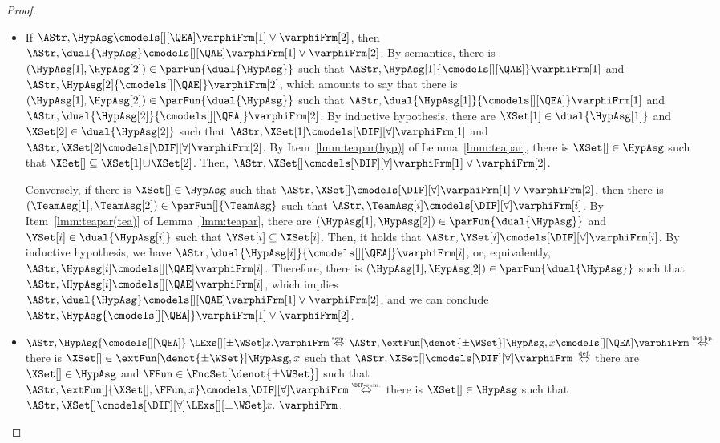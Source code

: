 \documentclass[authoryear]{elsarticle}
\newcommand{\iffExpl}[1]{\mathrel{\stackrel{\text{\tiny #1}}{\Leftrightarrow}}}
\newcommand{\Team}[1][]{{\XSet[#1]}}
\newcommand{\IFmodels}{\cmodels[\DIF][\forall]}
\newcommand{\EAmodels}{{\cmodels[][\QEA]}}
\newcommand{\AEmodels}{{\cmodels[][\QAE]}}
\begin{document}
\begin{proof}
\begin{itemize}
\begin{itemize}
    \item[{($\varphiFrm[][_\exists]=\varphiFrm[1] \lor \varphiFrm[2]$)}]
      If $\AStr, \HypAsg \cmodels[][\QEA] \varphiFrm[1] \lor \varphiFrm[2]$,
      then $\AStr, \dual{\HypAsg} \cmodels[][\QAE] \varphiFrm[1] \lor
      \varphiFrm[2]$.
      By semantics, there is $(\HypAsg[1],\HypAsg[2])\in\parFun{\dual{\HypAsg}}$
      such that $\AStr, \HypAsg[1] \AEmodels \varphiFrm[1]$ and $\AStr,
      \HypAsg[2] \AEmodels \varphiFrm[2]$, which amounts to say that there is
      $(\HypAsg[1],\HypAsg[2])\in\parFun{\dual{\HypAsg}}$ such that $\AStr,
      \dual{\HypAsg[1]} \EAmodels \varphiFrm[1]$ and $\AStr, \dual{\HypAsg[2]}
      \EAmodels \varphiFrm[2] $.
      By inductive hypothesis, there are $\Team[1] \in \dual{\HypAsg[1]}$ and
      $\Team[2] \in \dual{\HypAsg[2]}$ such that $\AStr, \Team[1] \IFmodels
      \varphiFrm[1]$ and $\AStr, \Team[2] \IFmodels \varphiFrm[2]$.
      By Item~\ref{lmm:teapar(hyp)} of Lemma~\ref{lmm:teapar}, there is $\Team
      \in \HypAsg$ such that $\Team \subseteq \Team[1] \!\cup\! \Team[2]$.
      Then, $\AStr, \Team \IFmodels \varphiFrm[1] \lor \varphiFrm[2]$.

      Conversely, if there is $\Team \in \HypAsg$ such that $\AStr, \Team
      \IFmodels \varphiFrm[1] \lor \varphiFrm[2]$, then there is $(\TeamAsg[1],
      \TeamAsg[2]) \in \parFun[]{\TeamAsg}$ such that $\AStr, \TeamAsg[i]
      \cmodels[\DIF][\forall] \varphiFrm[i]$.
      By Item~\ref{lmm:teapar(tea)} of Lemma~\ref{lmm:teapar}, there are
      $(\HypAsg[1], \HypAsg[2]) \in \parFun{\dual{\HypAsg}}$ and $\YSet[i] \in
      \dual{\HypAsg[i]}$ such that $\YSet[i] \subseteq \Team[i]$.
      Then, it holds that $\AStr, \YSet[i] \IFmodels \varphiFrm[i]$.
      By inductive hypothesis, we have $\AStr, \dual{\HypAsg[i]} \EAmodels
      \varphiFrm[i]$, or, equivalently, $\AStr, \HypAsg[i] \cmodels[][\QAE]
      \varphiFrm[i]$.
      Therefore, there is $(\HypAsg[1],\HypAsg[2])\in\parFun{\dual{\HypAsg}}$
      such that $\AStr, \HypAsg[i] \cmodels[][\QAE] \varphiFrm[i]$, which
      implies $\AStr, \dual{\HypAsg} \cmodels[][\QAE] \varphiFrm[1] \lor
      \varphiFrm[2]$, and we can conclude $\AStr, \HypAsg \EAmodels
      \varphiFrm[1] \lor \varphiFrm[2]$.

    \item[{$(\varphiFrm[][_\exists] = \LExs[][\pm\WSet] x. \varphiFrm)$}]
      $\AStr, \HypAsg \EAmodels\; \LExs[][\pm\WSet] x. \varphiFrm \iffExpl{sem.}
      \AStr, \extFun[\denot{\pm\WSet}]{\HypAsg, x} \EAmodels \varphiFrm
      \iffExpl{ind.hp.}$ there is $\Team \in \extFun[\denot{\pm\WSet}]{\HypAsg,
        x}$ such that $\AStr, \Team\IFmodels \varphiFrm$ $\iffExpl{def.}$ there
      are $\Team \in \HypAsg$ and $\FFun \in \FncSet[\denot{\pm\WSet}]{}$ such
      that $\AStr,
      \extFun[]{\Team,\FFun,x}\IFmodels\varphiFrm\iffExpl{\DIF-sem.}$ there is
      $\Team \in \HypAsg$ such that $\AStr, \Team \IFmodels \LExs[][\pm\WSet]
      x.\ \varphiFrm$.


\end{itemize}
\end{itemize}
\end{proof}
\end{document}
